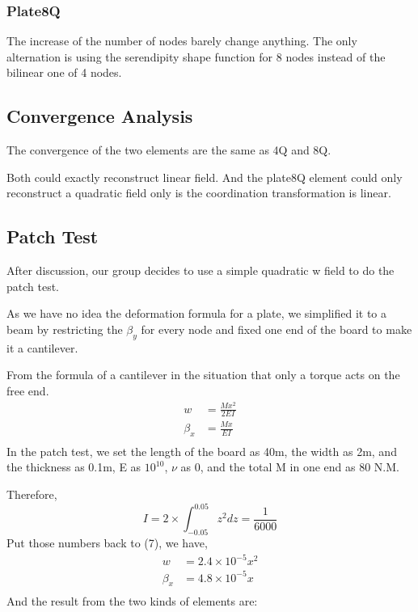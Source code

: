 \documentclass[UTF8]{ctexbook}
\begin{document}
     \subsubsection{Plate8Q}
     The increase of the number of nodes barely change anything. The only alternation is using the serendipity shape function for 8 nodes instead of the bilinear one of 4 nodes.
     \subsection{Convergence Analysis}
     The convergence of the two elements are the same as 4Q and 8Q. 
     
     Both could exactly reconstruct linear field. And the plate8Q element could only reconstruct a quadratic field only is the coordination transformation is linear. 
     \subsection{Patch Test}
     After discussion, our group decides to use a simple quadratic w field to do the patch test.
     
     As we have no idea the deformation formula for a plate, we simplified it to a beam by restricting the $\beta_y$ for every node and fixed one end of the board to make it a cantilever.
     
     From the formula of a cantilever in the situation that only a torque acts on the free end.
     \begin{equation}
        \begin{split}
            w &= \frac{Mx^2}{2EI} \\
            \beta_x &= \frac{Mx}{EI} \\
        \end{split}
     \end{equation}
     In the patch test, we set the length of the board as 40m, the width as 2m, and the thickness as 0.1m, E as $10^10$, $\nu$ as 0, and the total M in one end as 80 N.M.
     
     Therefore, 
     \begin{equation}
        I = 2\times\int^{0.05}_{-0.05} z^2dz = \frac{1}{6000}
     \end{equation}
     Put those numbers back to (7), we have,
     \begin{equation}
        \begin{split}
            w &= 2.4\times10^{-5} x^2 \\
            \beta_x &= 4.8\times10^{-5} x \\
        \end{split}     
     \end{equation}
     And the result from the two kinds of elements are:
     
\end{document}
